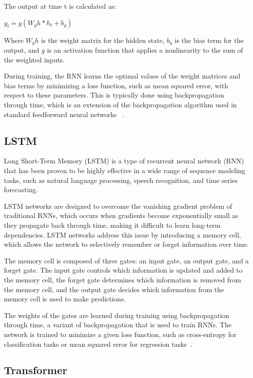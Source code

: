\documentclass[final]{cvpr}
\begin{document}
The output at time t is calculated as:

$y_t = g(W_yh * h_t + b_y)$

Where $W_yh$ is the weight matrix for the hidden state, $b_y$ is the bias term for the output, and $g$ is an activation function that applies a nonlinearity to the sum of the weighted inputs.

During training, the RNN learns the optimal values of the weight matrices and bias terms by minimizing a loss function, such as mean squared error, with respect to these parameters. This is typically done using backpropagation through time, which is an extension of the backpropagation algorithm used in standard feedforward neural networks ~\cite{rumelhart1986learning}.



\subsection{LSTM}

Long Short-Term Memory (LSTM) is a type of recurrent neural network (RNN) that has been proven to be highly effective in a wide range of sequence modeling tasks, such as natural language processing, speech recognition, and time series forecasting.

LSTM networks are designed to overcome the vanishing gradient problem of traditional RNNs, which occurs when gradients become exponentially small as they propagate back through time, making it difficult to learn long-term dependencies. LSTM networks address this issue by introducing a memory cell, which allows the network to selectively remember or forget information over time.

The memory cell is composed of three gates: an input gate, an output gate, and a forget gate. The input gate controls which information is updated and added to the memory cell, the forget gate determines which information is removed from the memory cell, and the output gate decides which information from the memory cell is used to make predictions.

The weights of the gates are learned during training using backpropagation through time, a variant of backpropagation that is used to train RNNs. The network is trained to minimize a given loss function, such as cross-entropy for classification tasks or mean squared error for regression tasks~\cite{Authors04}.

\subsection{Transformer}
\end{document}
